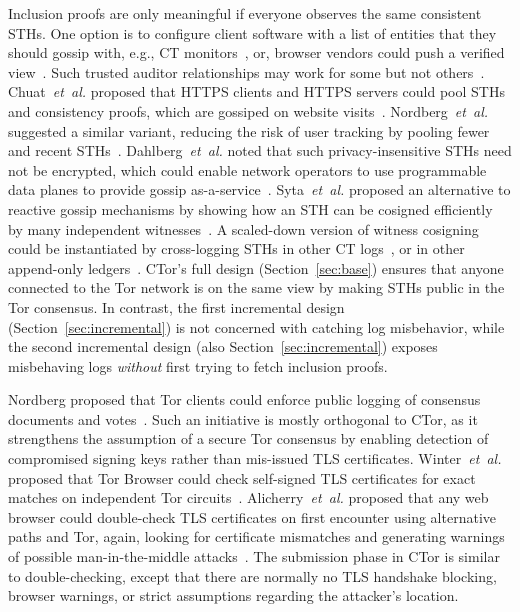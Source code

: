 Inclusion proofs are only meaningful if everyone observes the same consistent
STHs. One option is to configure client software with a list of entities that
they should gossip with, e.g., CT monitors~\cite{chase}, or, browser vendors
could push a verified view~\cite{sth-push}. Such trusted auditor relationships
may work for some but not others~\cite{nordberg}. Chuat~\emph{et~al.} proposed
that HTTPS clients and HTTPS servers could pool STHs and consistency proofs,
which are gossiped on website visits~\cite{chuat}. Nordberg~\emph{et~al.}
suggested a similar variant, reducing the risk of user tracking by pooling fewer
and recent STHs~\cite{nordberg}. Dahlberg~\emph{et~al.} noted that such
privacy-insensitive STHs need not be encrypted, which could enable network
operators to use programmable data planes to provide gossip
as-a-service~\cite{dahlberg}. Syta~\emph{et~al.} proposed an alternative to
reactive gossip mechanisms by showing how an STH can be cosigned efficiently by
many independent witnesses~\cite{syta}. A scaled-down version of witness
cosigning could be instantiated by cross-logging STHs in other CT
logs~\cite{minimal-gossip}, or in other append-only ledgers~\cite{catena}.
CTor's full design (Section~\ref{sec:base}) ensures that anyone connected to the
Tor network is on the same view by making STHs public in the Tor consensus.  In
contrast, the first incremental design (Section~\ref{sec:incremental}) is not
concerned with catching log misbehavior, while the second incremental design
(also Section~\ref{sec:incremental}) exposes misbehaving logs \emph{without}
first trying to fetch inclusion proofs.

Nordberg proposed that Tor clients could enforce public logging of consensus
documents and votes~\cite{consensus-transparency}.  Such an initiative is mostly
orthogonal to CTor, as it strengthens the assumption of a secure Tor consensus
by enabling detection of compromised signing keys rather than mis-issued TLS
certificates.  Winter~\emph{et~al.} proposed that Tor Browser could check
self-signed TLS certificates for exact matches on independent Tor
circuits~\cite{spoiled-onions}.  Alicherry~\emph{et~al.} proposed that any web
browser could double-check TLS certificates on first encounter using alternative
paths and Tor, again, looking for certificate mismatches and generating warnings
of possible man-in-the-middle attacks~\cite{doublecheck}.  The submission phase
in CTor is similar to double-checking, except that there are normally no TLS
handshake blocking, browser warnings, or strict assumptions regarding the
attacker's location.
